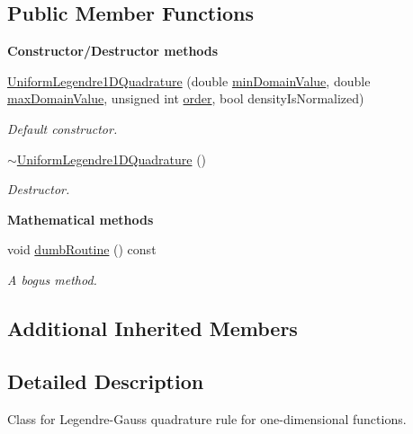 \subsection*{Public Member Functions}
\begin{Indent}{\bf Constructor/\-Destructor methods}\par
\begin{DoxyCompactItemize}
\item 
\hyperlink{class_q_u_e_s_o_1_1_uniform_legendre1_d_quadrature_a2893373338683fa72a6bfb321e58750e}{Uniform\-Legendre1\-D\-Quadrature} (double \hyperlink{class_q_u_e_s_o_1_1_base1_d_quadrature_a938187458b0069e7b3779bc3739a1cc0}{min\-Domain\-Value}, double \hyperlink{class_q_u_e_s_o_1_1_base1_d_quadrature_af3d09abe6716a23f9061b8b657524547}{max\-Domain\-Value}, unsigned int \hyperlink{class_q_u_e_s_o_1_1_base1_d_quadrature_a07713b5e8df24bbc8e3e9d13b707e5d0}{order}, bool density\-Is\-Normalized)
\begin{DoxyCompactList}\small\item\em Default constructor. \end{DoxyCompactList}\item 
\hyperlink{class_q_u_e_s_o_1_1_uniform_legendre1_d_quadrature_a6b6ba4d00a8865df9a3d90ab0c27f332}{$\sim$\-Uniform\-Legendre1\-D\-Quadrature} ()
\begin{DoxyCompactList}\small\item\em Destructor. \end{DoxyCompactList}\end{DoxyCompactItemize}
\end{Indent}
\begin{Indent}{\bf Mathematical methods}\par
\begin{DoxyCompactItemize}
\item 
void \hyperlink{class_q_u_e_s_o_1_1_uniform_legendre1_d_quadrature_a4d63fb6517b84b37e47da5cea15bc2b1}{dumb\-Routine} () const 
\begin{DoxyCompactList}\small\item\em A bogus method. \end{DoxyCompactList}\end{DoxyCompactItemize}
\end{Indent}
\subsection*{Additional Inherited Members}


\subsection{Detailed Description}
Class for Legendre-\/\-Gauss quadrature rule for one-\/dimensional functions. 

